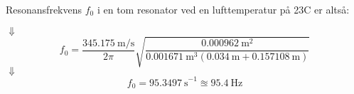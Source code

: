 Resonansfrekvens $f_{0}$ i en tom resonator ved en lufttemperatur på 23\degree C er altså:

\fnul
$\Downarrow$   
\begin{equation}
		f_{0} = \frac{\SI{345,175}{\meter / \second}}{2\pi}\sqrt{\frac{\SI{0,000962}{\meter^{2}}}{{\SI{0,001671}{\meter^{3}}}({\SI{0,034}{\meter}}+{\SI{0,157108}{\meter}})}} 
	\end{equation}	
$\Downarrow$
\begin{equation}
	f_{0} = {\SI{95,3497}{\second}^{-1}} \approxeq {\SI{95,4}{\hertz}} 	
	\end{equation}
	
















